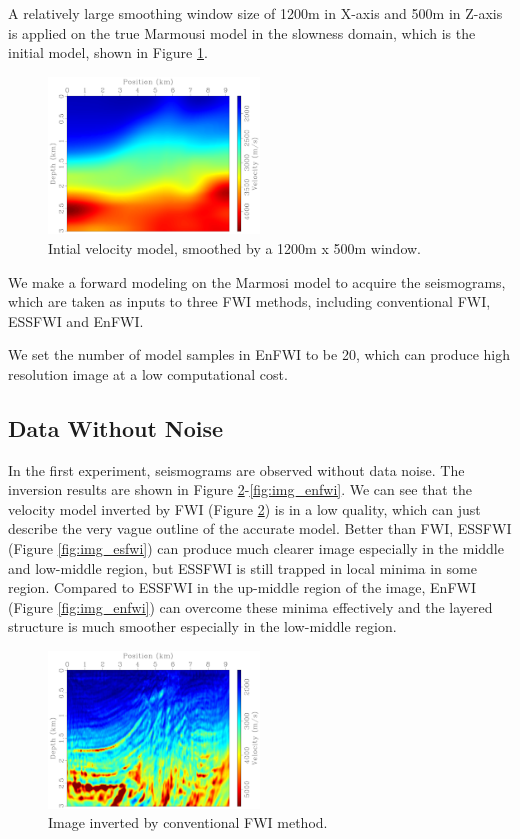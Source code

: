 \documentclass[mreferee]{gji}
\begin{document}
A relatively large smoothing window size of 1200m in X-axis and 500m in Z-axis is applied on the true Marmousi model in the slowness domain, which is the initial model, shown in Figure \ref{fig:smoothed_model}.

\begin{figure}
\center
\includegraphics[width=0.5\textwidth]{fig/marmvel_smoothed.pdf}
\caption{Intial velocity model, smoothed by a 1200m x 500m window.}
\label{fig:smoothed_model}
\end{figure}

We make a forward modeling on the Marmosi model to acquire the seismograms, which are taken as inputs to three FWI methods, including conventional FWI, ESSFWI and EnFWI.

We set the number of model samples in EnFWI to be 20, which can produce high resolution image at a low computational cost.

\subsection{Data Without Noise}

In the first experiment, seismograms are observed without data noise. The inversion results are shown in Figure \ref{fig:img_fwi}-\ref{fig:img_enfwi}. We can see that the velocity model inverted by FWI (Figure \ref{fig:img_fwi}) is in a low quality, which can just describe the very vague outline of the accurate model. Better than FWI, ESSFWI (Figure \ref{fig:img_esfwi}) can produce much clearer image especially in the middle and low-middle region, but ESSFWI is still trapped in local minima in some region. Compared to ESSFWI in the up-middle region of the image, EnFWI (Figure \ref{fig:img_enfwi}) can overcome these minima effectively and the layered structure is much smoother especially in the low-middle region.

\begin{figure}
\center
\includegraphics[width=0.5\textwidth]{fig/fwi.pdf}
\caption{Image inverted by conventional FWI method.}
\label{fig:img_fwi}
\end{figure}
\end{document}
